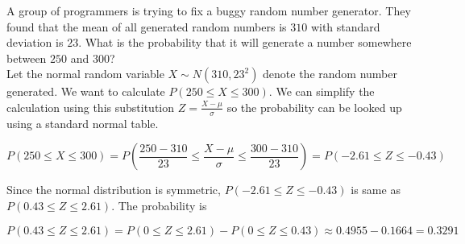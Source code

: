\documentclass[12pt, a4paper]{article}
\newcounter{exa}
\begin{document}
\begin{texample}
A group of programmers is trying to fix a buggy random number generator. They found that the mean of all generated random numbers is $310$ with standard deviation is $23$. What is the probability that it will generate a number somewhere between $250$ and $300$? \\

Let the normal random variable $X\sim N(310, 23^2)$ denote the random number generated. We want to calculate $P(250\le X\le 300)$. We can simplify the calculation using this substitution $Z=\frac{X-\mu}{\sigma}$ so the probability can be looked up using a standard normal table.

$$P(250\le X\le 300) = P(\frac{250-310}{23} \le \frac{X-\mu}{\sigma} \le \frac{300-310}{23}) = P(-2.61 \le Z \le -0.43)$$

Since the normal distribution is symmetric, $P(-2.61 \le Z \le -0.43)$ is same as $P(0.43 \le Z \le 2.61)$. The probability is

$$P(0.43 \le Z \le 2.61)=P(0 \le Z \le 2.61) - P(0 \le Z \le 0.43) \approx 0.4955 - 0.1664=0.3291$$
\end{texample}
\end{document}
